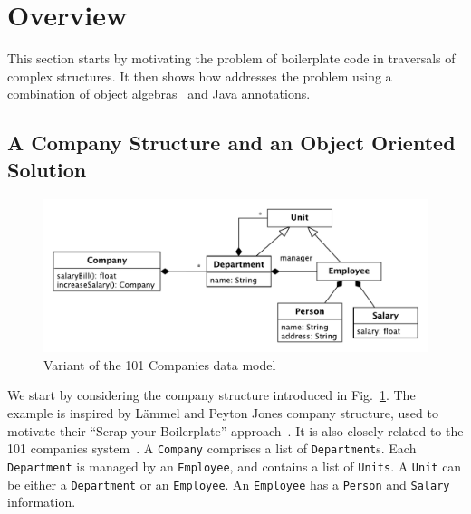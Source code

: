 \section{Overview}\label{subsec:overview}

This section starts by motivating the problem of boilerplate code in
traversals of complex structures. It then shows how \name addresses
the problem using a combination of object algebras~\cite{bruno12oa}
and Java annotations.



\subsection{A Company Structure and an Object Oriented Solution}

\begin{figure}[t]
\centering
\includegraphics[width=0.9\linewidth]{101companies}
\caption{Variant of the 101 Companies data model\label{company_structure}}
\end{figure}

We start by considering the company structure introduced in
Fig.~\ref{company_structure}. The example is inspired by L\"ammel
and Peyton Jones company structure, used to motivate their ``Scrap
your Boilerplate'' approach~\cite{ralf03syb}. It is also closely
related to the 101 companies system~\cite{Inauguration101}.  A
\lstinline{Company} comprises a list of \lstinline{Department}s. Each
\lstinline{Department} is managed by an \lstinline{Employee}, and
contains a list of \lstinline{Units}. A \lstinline{Unit} can be
either a \lstinline{Department} or an \lstinline{Employee}. An
\lstinline{Employee} has a \lstinline{Person} and
\lstinline{Salary} information.

